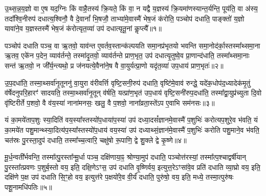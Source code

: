 
{\anuvakamend[{विलि॑ष्टन्त्रि॒ꣳ॒शच्च॑॥12॥}]}

{}

\setcounter{anuvakam}{0}
उ॒थ्स॒न्न॒य॒ज्ञो वा ए॒ष यद॒ग्निः किं वाहै॒तस्य॑ क्रि॒यते॒ किं वा॒ न यद्वै य॒ज्ञस्य॑ क्रि॒यमा॑णस्यान्त॒र्यन्ति॒ पूय॑ति॒ वा अ॑स्य॒ तदा᳚श्वि॒नीरुप॑ दधात्य॒श्विनौ॒ वै दे॒वानां᳚ भि॒षजौ॒ ताभ्या॑मे॒वास्मै॑ भेष॒जं क॑रोति॒ पञ्चोप॑ दधाति॒ पाङ्क्तो॑ य॒ज्ञो यावा॑ने॒व य॒ज्ञस्तस्मै॑ भेष॒जं क॑रोत्यृत॒व्या॑ उप॑ दधात्यृतू॒नां कॢप्त्यै᳚॥१॥

पञ्चोप॑ दधाति पञ्च॒ वा ऋ॒तवो॒ याव॑न्त ए॒वर्तव॒स्तान्क॑ल्पयति समा॒नप्र॑भृतयो भवन्ति समा॒नोद॑र्का॒स्तस्मा᳚थ्समा॒ना ऋ॒तव॒ एके॑न प॒देन॒ व्याव॑र्तन्ते॒ तस्मा॑दृ॒तवो॒ व्याव॑र्तन्ते प्राण॒भृत॒ उप॑ दधात्यृ॒तुष्वे॒व प्रा॒णान्द॑धाति॒ तस्मा᳚थ्समा॒नाः सन्त॑ ऋ॒तवो॒ न जी᳚र्य॒न्त्यथो॒ प्र ज॑नयत्ये॒वैना॑ने॒ष वै वा॒युर्यत्प्रा॒णो यदृ॑त॒व्या॑ उप॒धाय॑ प्राण॒भृतः॑॥२॥

उ॒प॒दधा॑ति॒ तस्मा॒थ्सर्वा॑नृ॒तूननु॑ वा॒युरा व॑रीवर्त्ति वृष्टि॒सनी॒रुप॑ दधाति॒ वृष्टि॑मे॒वाव॑ रुन्द्धे॒ यदे॑क॒धोप॑द॒ध्यादेक॑मृ॒तुं व॑र्\mbox{}षेदनुपरि॒हारꣳ॑ सादयति॒ तस्मा॒थ्सर्वा॑नृ॒तून् व॑र्\mbox{}षति॒ यत्प्रा॑ण॒भृत॑ उप॒धाय॑ वृष्टि॒सनी॑रुप॒दधा॑ति॒ तस्मा᳚द्वा॒युप्र॑च्युता दि॒वो वृ॑ष्टिरीर्ते प॒शवो॒ वै व॑य॒स्या॑ नाना॑मनसः॒ खलु॒ वै प॒शवो॒ नाना᳚व्रता॒स्ते॑\-ऽप ए॒वाभि सम॑नसः॥३॥

यं का॒मये॑ताप॒शुः स्या॒दिति॑ वय॒स्या᳚स्तस्यो॑प॒धाया॑प॒स्या॑ उप॑ दध्या॒दसं᳚ज्ञानमे॒वास्मै॑ प॒शुभिः॑ करोत्यप॒शुरे॒व भ॑वति॒ यं का॒मये॑त पशु॒मान्थ्स्या॒दित्य॑प॒स्या᳚स्तस्यो॑प॒धाय॑ वय॒स्या॑ उप॑ दध्याथ्सं॒ज्ञान॑मे॒वास्मै॑ प॒शुभिः॑ करोति पशु॒माने॒व भ॑वति॒ चत॑स्रः पु॒रस्ता॒दुप॑ दधाति॒ तस्मा᳚च्च॒त्वारि॒ चक्षु॑षो रू॒पाणि॒ द्वे शु॒क्ले द्वे कृ॒ष्णे॥४॥

मू॒र्ध॒न्वती᳚र्भवन्ति॒ तस्मा᳚त्पु॒रस्ता᳚न्मू॒र्धा पञ्च॒ दक्षि॑णाया॒ꣴ॒ श्रोण्या॒मुप॑ दधाति॒ पञ्चोत्त॑रस्यां॒ तस्मा᳚त्प॒श्चाद्वर्\mbox{}षी॑यान् पु॒रस्ता᳚त्प्रवणः प॒शुर्ब॒स्तो वय॒ इति॒ दक्षि॒णे\-ऽꣳस॒ उप॑ दधाति वृ॒ष्णिर्वय॒ इत्युत्त॒रे\-ऽꣳसा॑वे॒व प्रति॑ दधाति व्या॒घ्रो वय॒ इति॒ दक्षि॑णे प॒क्ष उप॑ दधाति सि॒ꣳ॒हो वय॒ इत्युत्त॑रे प॒क्षयो॑रे॒व वी॒र्यं॑ दधाति॒ पुरु॑षो॒ वय॒ इति॒ मध्ये॒ तस्मा॒त्पुरु॑षः पशू॒नामधि॑पतिः॥५॥

